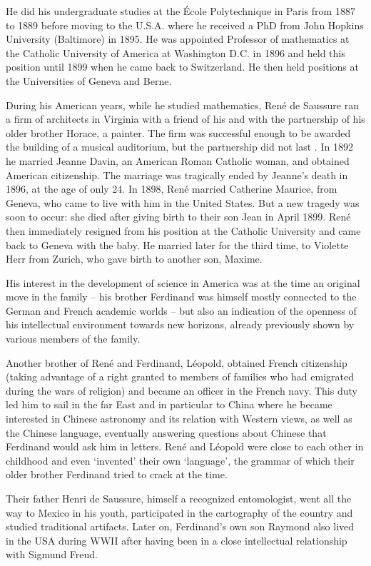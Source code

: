 \begin{refsection}
He did his undergraduate studies at the École Polytechnique in Paris
from 1887 to 1889 before moving to the U.S.A. where he received a PhD
from John Hopkins University (Baltimore) in 1895. He was appointed
Professor of mathematics at the Catholic University of America at
Washington D.C. in 1896 and held this position until 1899 when he came
back to Switzerland. He then held positions at the Universities of
Geneva and Berne.

During his American years, while he studied mathematics, René de
Saussure ran a firm of architects in Virginia with a friend of his and
with the partnership of his older brother Horace, a painter. The firm
was successful enough to be awarded the building of a musical
auditorium, but the partnership did not last
. In 1892 he married Jeanne Davin,
an American Roman Catholic woman, and obtained American
citizenship. The marriage was tragically ended by Jeanne’s death in
1896, at the age of only 24. In 1898, René married Catherine Maurice,
from Geneva, who came to live with him in the United States. But a new
tragedy was soon to occur: she died after giving birth to their son
Jean in April 1899. René then immediately resigned from his position
at the Catholic University and came back to Geneva with the baby. He
married later for the third time, to Violette Herr from Zurich, who
gave birth to another son, Maxime.

His interest in the development of science in America was at the time
an original move in the family -- his brother Ferdinand was himself
mostly connected to the German and French academic worlds -- but also
an indication of the openness of his intellectual environment towards
new horizons, already previously shown by various members of the
family.

Another brother of René and Ferdinand, Léopold, obtained French
citizenship (taking advantage of a right granted to members of
families who had emigrated during the wars of religion) and became an
officer in the French navy. This duty led him to sail in the far East
and in particular to China where he became interested in Chinese
astronomy and its relation with Western views, as well as the Chinese
language, eventually answering questions about Chinese that Ferdinand
would ask him in letters. René and Léopold were close to each other in
childhood and even `invented' their own `language', the grammar of
which their older brother Ferdinand tried to crack at the time.

Their father Henri de Saussure, himself a recognized entomologist,
went all the way to Mexico in his youth, participated in the
cartography of the country and studied traditional artifacts. Later
on, Ferdinand’s own son Raymond also lived in the USA during WWII
after having been in a close intellectual relationship with Sigmund
Freud. 


\end{refsection}
